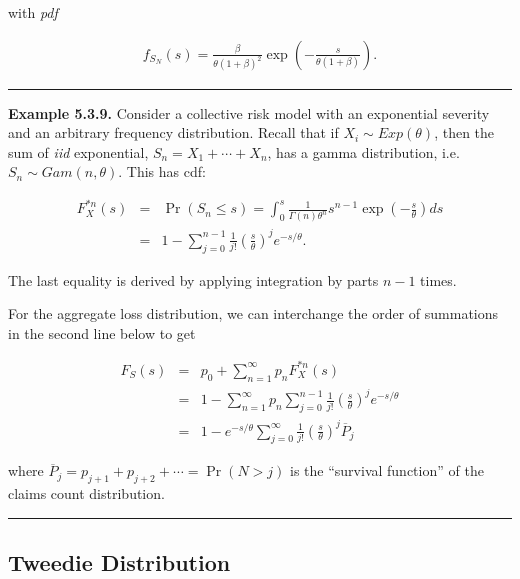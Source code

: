 \documentclass[]{book}
\theoremstyle{definition}
\theoremstyle{definition}
\theoremstyle{definition}
\theoremstyle{remark}
\begin{document}
with \emph{pdf}

\begin{eqnarray*}
f_{S_N}(s) = \frac{\beta}{\theta (1+\beta)^2}\exp\left( -\frac{s}{
\theta (1+\beta)}\right).
\end{eqnarray*}

\begin{center}\rule{0.5\linewidth}{\linethickness}\end{center}

\textbf{Example 5.3.9.} Consider a collective risk model with an
exponential severity and an arbitrary frequency distribution. Recall
that if \(X_i\sim Exp(\theta)\), then the sum of \emph{iid} exponential,
\(S_n=X_1+\cdots+X_n\), has a gamma distribution, i.e.
\(S_n\sim Gam(n,\theta)\). This has cdf:

\begin{eqnarray*}
F_{X}^{\ast n}(s) &=& \Pr (S_n \le s) = \int_{0}^{s} \frac{1}{\Gamma(n)\theta^n}s^{n-1}\exp\left(-\frac{s}{\theta}\right) ds\\
&=& 1-\sum_{j=0}^{n-1}\frac{1}{j!}\left( \frac{s}{\theta}\right)^j e^{-s/\theta } .
\end{eqnarray*}

The last equality is derived by applying integration by parts \(n-1\)
times.

For the aggregate loss distribution, we can interchange the order of
summations in the second line below to get

\begin{eqnarray*}
F_{S}\left(s\right) &=& p_{0}+\sum_{n=1}^{\infty }p_n F_{X}^{\ast n}\left(s\right)\\
&=& 1 - \sum_{n=1}^{\infty }p_n \sum_{j=0}^{n-1}\frac{1}{j!}
\left( \frac{s}{\theta}\right)^j e^{-s/\theta }\\
&=& 1-e^{-s/\theta}\sum_{j=0}^{\infty} \frac{1}{j!}
\left( \frac{s}{\theta} \right)^j \overline{P}_j
\end{eqnarray*}

where \(\overline{P}_j =p_{j+1}+p_{j+2}+\cdots = \Pr (N>j)\) is the
``survival function'' of the claims count distribution.

\begin{center}\rule{0.5\linewidth}{\linethickness}\end{center}

\subsection{Tweedie Distribution}\label{tweedie-distribution}
\end{document}

